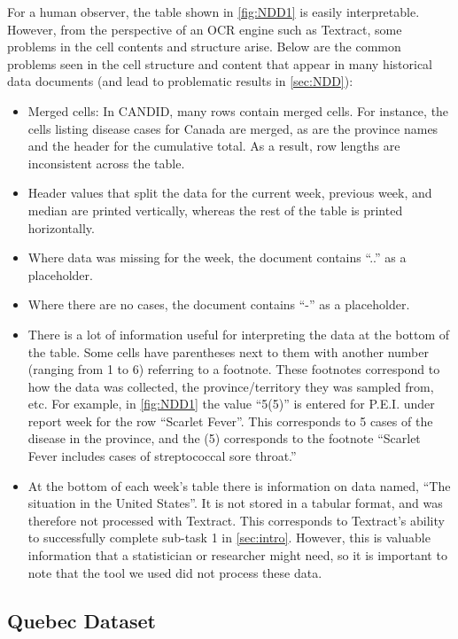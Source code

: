 \documentclass[12pt]{article}
\begin{document}
For a human observer, the table shown in \cref{fig:NDD1} is easily interpretable. However, from the perspective of an OCR engine such as Textract, some problems in the cell contents and structure arise. Below are the common problems seen in the cell structure and content that appear in many historical data documents (and lead to problematic results in \cref{sec:NDD}):

\begin{itemize}
    \item Merged cells: In CANDID, many rows contain merged cells. For instance, the cells listing disease cases for Canada are merged, as are the province names and the header for the cumulative total. As a result, row lengths are inconsistent across the table.
    \item Header values that split the data for the current week, previous week, and median are printed vertically, whereas the rest of the table is printed horizontally.
    \item Where data was missing for the week, the document contains ``..'' as a placeholder.
    \item Where there are no cases, the document contains ``-'' as a placeholder.
    \item There is a lot of information useful for interpreting the data at the bottom of the table. Some cells have parentheses next to them with another number (ranging from 1 to 6) referring to a footnote. These footnotes correspond to how the data was collected, the province/territory they was sampled from, etc. For example, in \cref{fig:NDD1} the value ``5(5)'' is entered for P.E.I. under report week for the row ``Scarlet Fever''. This corresponds to 5 cases of the disease in the province, and the (5) corresponds to the footnote ``Scarlet Fever includes cases of streptococcal sore throat.''
    \item At the bottom of each week's table there is information on data named, ``The situation in the United States''. It is not stored in a tabular format, and was therefore not processed with Textract. This corresponds to Textract's ability to successfully complete sub-task 1 in \cref{sec:intro}. However, this is valuable information that a statistician or researcher might need, so it is important to note that the tool we used did not process these data.
\end{itemize}




\subsection{Quebec Dataset}
\end{document}
